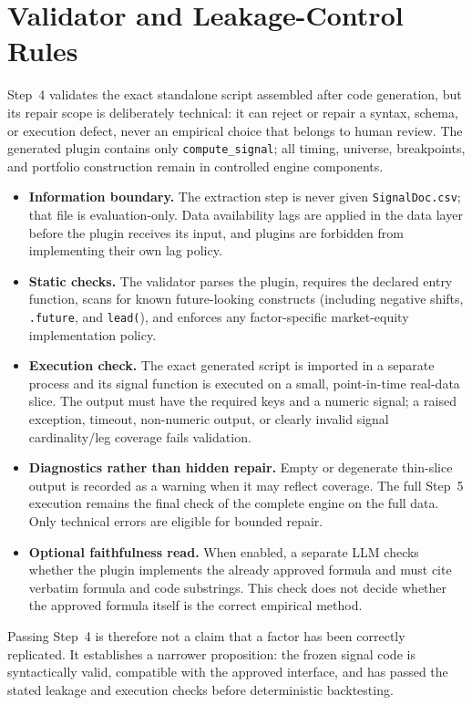 \section{Validator and Leakage-Control Rules}
\label{app:validator}

Step~4 validates the exact standalone script assembled after code generation,
but its repair scope is deliberately technical: it can reject or repair a
syntax, schema, or execution defect, never an empirical choice that belongs
to human review. The generated plugin contains only
\texttt{compute\_signal}; all timing, universe, breakpoints, and portfolio
construction remain in controlled engine components.

\begin{itemize}[nosep]
  \item \textbf{Information boundary.} The extraction step is never given
    \texttt{SignalDoc.csv}; that file is evaluation-only. Data availability
    lags are applied in the data layer before the plugin receives its input,
    and plugins are forbidden from implementing their own lag policy.
  \item \textbf{Static checks.} The validator parses the plugin, requires
    the declared entry function, scans for known future-looking constructs
    (including negative shifts, \texttt{.future}, and \texttt{lead(}), and
    enforces any factor-specific market-equity implementation policy.
  \item \textbf{Execution check.} The exact generated script is imported in
    a separate process and its signal function is executed on a small,
    point-in-time real-data slice. The output must have the required keys and
    a numeric signal; a raised exception, timeout, non-numeric output, or
    clearly invalid signal cardinality/leg coverage fails validation.
  \item \textbf{Diagnostics rather than hidden repair.} Empty or degenerate
    thin-slice output is recorded as a warning when it may reflect coverage.
    The full Step~5 execution remains the final check of the complete engine
    on the full data. Only technical errors are eligible for bounded repair.
  \item \textbf{Optional faithfulness read.} When enabled, a separate LLM
    checks whether the plugin implements the already approved formula and
    must cite verbatim formula and code substrings. This check does not decide
    whether the approved formula itself is the correct empirical method.
\end{itemize}

Passing Step~4 is therefore not a claim that a factor has been correctly
replicated. It establishes a narrower proposition: the frozen signal code is
syntactically valid, compatible with the approved interface, and has passed
the stated leakage and execution checks before deterministic backtesting.
